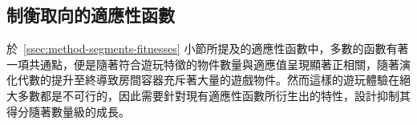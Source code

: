 









\subsection{制衡取向的適應性函數}
\label{ssec:method-segments-balancefitness}

於~\ref{ssec:method-segments-fitnesses} 小節所提及的適應性函數中，多數的函數有著一項共通點，便是隨著符合遊玩特徵的物件數量與適應值呈現顯著正相關，隨著演化代數的提升至終導致房間容器充斥著大量的遊戲物件。然而這樣的遊玩體驗在絕大多數都是不可行的，因此需要針對現有適應性函數所衍生出的特性，設計抑制其得分隨著數量級的成長。

